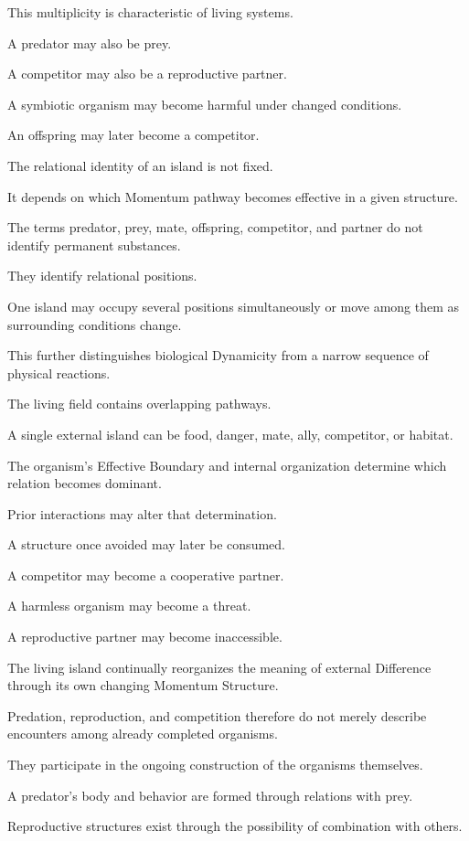 This multiplicity is characteristic of living systems.

A predator may also be prey.

A competitor may also be a reproductive partner.

A symbiotic organism may become harmful under changed conditions.

An offspring may later become a competitor.

The relational identity of an island is not fixed.

It depends on which Momentum pathway becomes effective in a given structure.

The terms predator, prey, mate, offspring, competitor, and partner do not identify permanent substances.

They identify relational positions.

One island may occupy several positions simultaneously or move among them as surrounding conditions change.

This further distinguishes biological Dynamicity from a narrow sequence of physical reactions.

The living field contains overlapping pathways.

A single external island can be food, danger, mate, ally, competitor, or habitat.

The organism’s Effective Boundary and internal organization determine which relation becomes dominant.

Prior interactions may alter that determination.

A structure once avoided may later be consumed.

A competitor may become a cooperative partner.

A harmless organism may become a threat.

A reproductive partner may become inaccessible.

The living island continually reorganizes the meaning of external Difference through its own changing Momentum Structure.

Predation, reproduction, and competition therefore do not merely describe encounters among already completed organisms.

They participate in the ongoing construction of the organisms themselves.

A predator’s body and behavior are formed through relations with prey.

Reproductive structures exist through the possibility of combination with others.

